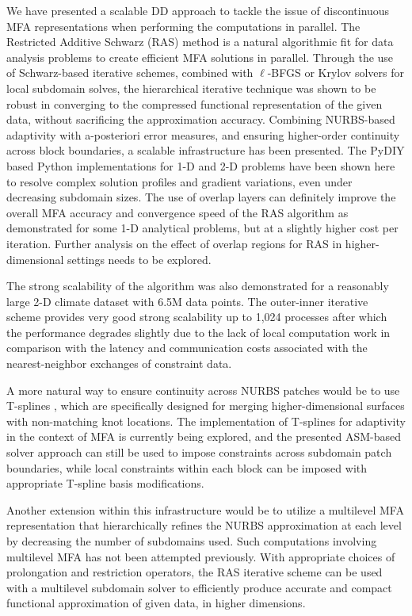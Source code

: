 \documentclass[conference]{IEEEtran}
\begin{document}
We have presented a scalable DD approach to tackle the issue of discontinuous MFA representations when performing the computations in parallel. The Restricted Additive Schwarz (RAS) method is a natural algorithmic fit for data analysis problems to create efficient MFA solutions in parallel. Through the use of Schwarz-based iterative schemes, combined with $\ell$-BFGS or Krylov solvers for local subdomain solves, the hierarchical iterative technique was shown to be robust in converging to the compressed functional representation of the given data, without sacrificing the approximation accuracy. Combining NURBS-based adaptivity with a-posteriori error measures, and ensuring higher-order continuity across block boundaries, a scalable infrastructure has been presented. The PyDIY based Python implementations for 1-D and 2-D problems have been shown here to resolve complex solution profiles and gradient variations, even under decreasing subdomain sizes. The use of overlap layers can definitely improve the overall MFA accuracy and convergence speed of the RAS algorithm as demonstrated for some 1-D analytical problems, but at a slightly higher cost per iteration. Further analysis on the effect of overlap regions for RAS in higher-dimensional settings needs to be explored. 

The strong scalability of the algorithm was also demonstrated for a reasonably large 2-D climate dataset with 6.5M data points. The outer-inner iterative scheme provides very good strong scalability up to 1,024 processes after which the performance degrades slightly due to the lack of local computation work in comparison with the latency and communication costs associated with the nearest-neighbor exchanges of constraint data. 

A more natural way to ensure continuity across NURBS patches would be to use T-splines \cite{sederberg-2004}, which are specifically designed for merging higher-dimensional surfaces with non-matching knot locations. The implementation of T-splines for adaptivity in the context of MFA is currently being explored, and the presented ASM-based solver approach can still be used to impose constraints across subdomain patch boundaries, while local constraints within each block 
can be imposed with appropriate T-spline basis modifications.

Another extension within this infrastructure would be to utilize a multilevel MFA representation that hierarchically refines the NURBS approximation at each level by decreasing the number of subdomains used. Such computations involving multilevel MFA has not been attempted previously. With appropriate choices of prolongation and restriction operators, the RAS iterative scheme can be used with a multilevel subdomain solver to efficiently produce accurate and compact functional approximation of given data, in higher dimensions.
\end{document}
